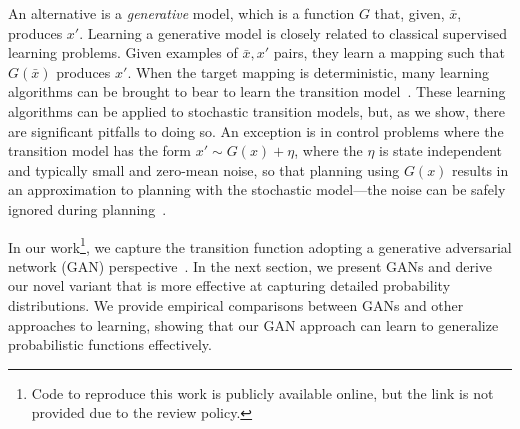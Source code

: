 \documentclass[letterpaper]{article} %
\begin{document}
An alternative is a \emph{generative} model, which is a function $G$ that, given, $\bar{x}$, produces $x'$.
%
%
Learning a generative model is closely related to classical supervised learning problems. Given examples of $\bar{x},x'$ pairs, they learn a mapping such that $G(\bar{x})$ produces $x'$. When the target mapping is deterministic, many learning algorithms can be brought to bear to learn the transition model~\cite{atkeson97b}.
These learning algorithms can be applied to stochastic transition models, but, as we show, there are significant pitfalls to doing so. An exception is in control problems where the transition model has the form $x' \sim G(x) + \eta$, where the $\eta$ is state independent and typically small and zero-mean noise, so that planning using $G(x)$ results in an approximation to planning with the stochastic model---the noise can be safely ignored during planning~\cite{Bradtke93}.

In our work\footnote{Code to reproduce this work is publicly available online, but the link is not provided due to the review policy.}, we capture the transition function adopting a generative adversarial network (GAN) perspective~\cite{goodfellow2014generative}. In the next section, we present GANs and derive our novel variant that is more effective at capturing detailed probability distributions. We provide empirical comparisons between GANs and other approaches to learning, showing that our GAN approach can learn to generalize probabilistic functions effectively.
\end{document}
